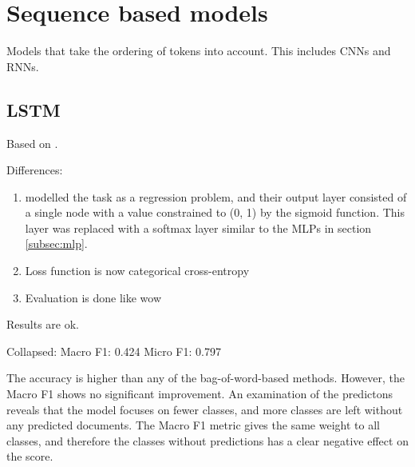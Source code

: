 \section{Sequence based models}

Models that take the ordering of tokens into account.
This includes \acp{CNN} and \acp{RNN}.

\subsection{LSTM}

Based on \textcite{taghipour16}.

Differences:

\begin{enumerate}
    \item \citeauthor{taghipour16} modelled the task as a regression problem,
        and their output layer consisted of a single node with a value constrained
        to (0, 1) by the sigmoid function. This layer was replaced with a softmax
        layer similar to the \acp{MLP} in section \ref{subsec:mlp}.
    \item Loss function is now categorical cross-entropy
    \item Evaluation is done like wow
\end{enumerate}

Results are ok.

Collapsed:
Macro F1: 0.424
Micro F1: 0.797

The accuracy is higher than any of the bag-of-word-based methods. However, the
Macro F1 shows no significant improvement. An examination of the predictons
reveals that the model focuses on fewer classes, and more classes are left
without any predicted documents. The Macro F1 metric gives the same weight to
all classes, and therefore the classes without predictions has a clear
negative effect on the score.


